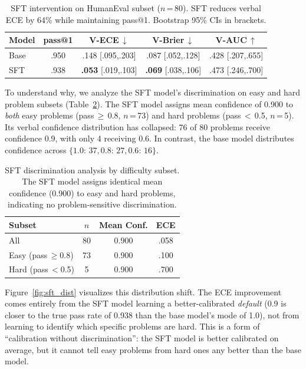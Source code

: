 \documentclass{article}
\begin{document}
\begin{table}[t]
\centering
\caption{SFT intervention on HumanEval subset ($n$\,=\,80). SFT reduces verbal ECE by 64\% while maintaining pass@1. Bootstrap 95\% CIs in brackets.}
\label{tab:sft}
\small
\setlength{\tabcolsep}{3pt}
\begin{tabular}{@{}lcccc@{}}
\toprule
\textbf{Model} & \textbf{pass@1} & \textbf{V-ECE\,$\downarrow$} & \textbf{V-Brier\,$\downarrow$} & \textbf{V-AUC\,$\uparrow$} \\
\midrule
Base  & .950 & .148 {\scriptsize[.095,.203]} & .087 {\scriptsize[.052,.128]} & .428 {\scriptsize[.207,.655]} \\
SFT   & .938 & \textbf{.053} {\scriptsize[.019,.103]} & \textbf{.069} {\scriptsize[.038,.106]} & .473 {\scriptsize[.246,.700]} \\
\bottomrule
\end{tabular}
\vspace{-0.5em}
\end{table}

To understand why, we analyze the SFT model's discrimination on easy and hard problem subsets (Table~\ref{tab:sft_disc}). The SFT model assigns mean confidence of 0.900 to \emph{both} easy problems (pass\,$\geq$\,0.8, $n$\,=\,73) and hard problems (pass\,$<$\,0.5, $n$\,=\,5). Its verbal confidence distribution has collapsed: 76 of 80 problems receive confidence 0.9, with only 4 receiving 0.6. In contrast, the base model distributes confidence across $\{1.0{:}\,37, 0.8{:}\,27, 0.6{:}\,16\}$.

\begin{table}[t]
\centering
\caption{SFT discrimination analysis by difficulty subset. The SFT model assigns identical mean confidence (0.900) to easy and hard problems, indicating no problem-sensitive discrimination.}
\label{tab:sft_disc}
\small
\begin{tabular}{@{}lccc@{}}
\toprule
\textbf{Subset} & $n$ & \textbf{Mean Conf.} & \textbf{ECE} \\
\midrule
All & 80 & 0.900 & .058 \\
Easy (pass\,$\geq$0.8) & 73 & 0.900 & .100 \\
Hard (pass\,$<$0.5) & 5 & 0.900 & .700 \\
\bottomrule
\end{tabular}
\vspace{-0.5em}
\end{table}

Figure~\ref{fig:sft_dist} visualizes this distribution shift. The ECE improvement comes entirely from the SFT model learning a better-calibrated \emph{default} (0.9 is closer to the true pass rate of 0.938 than the base model's mode of 1.0), not from learning to identify which specific problems are hard. This is a form of ``calibration without discrimination'': the SFT model is better calibrated on average, but it cannot tell easy problems from hard ones any better than the base model.
\end{document}
